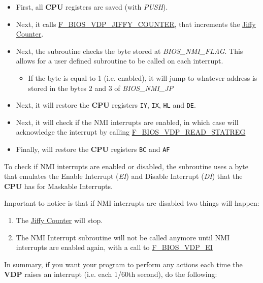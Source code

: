 \documentclass[a4paper,11pt]{article}
\begin{document}
    \begin{itemize}
        \item First, all \textbf{CPU} registers are saved (with \textit{PUSH}).
        \item Next, it calls \hyperref[func:fbiosvdpjiffycounter]
        {F\_BIOS\_VDP\_JIFFY\_COUNTER}, that increments the
        \hyperref[subsec:jiffy_counter]{Jiffy Counter}.
        \item Next, the subroutine checks the byte stored at
        \textit{BIOS\_NMI\_FLAG}. This allows for a user defined subroutine to
        be called on each interrupt.
        \begin{itemize}
            \item If the byte is equal to 1 (i.e. enabled), it will jump to
            whatever address is stored in the bytes 2 and 3 of
            \textit{BIOS\_NMI\_JP}
        \end{itemize}
        \item Next, it will restore the \textbf{CPU} registers \texttt{IY}, 
        \texttt{IX}, \texttt{HL} and \texttt{DE}.
        \item Next, it will check if the NMI interrupts are enabled, in which
        case will acknowledge the interrupt by calling
        \hyperref[func:fbiosvdpreadstatreg]{F\_BIOS\_VDP\_READ\_STATREG}
        \item Finally, will restore the \textbf{CPU} registers \texttt{BC} and 
        \texttt{AF}
    \end{itemize}

    To check if NMI interrupts are enabled or disabled, the subroutine uses a
    byte that emulates the Enable Interrupt (\textit{EI}) and Disable Interrupt
    (\textit{DI}) that the \textbf{CPU} has for Maskable Interrupts.

    Important to notice is that if NMI interrupts are disabled two things will
    happen:
    \begin{enumerate}
        \item The \hyperref[subsec:jiffy_counter]{Jiffy Counter} will stop.
        \item The NMI Interrupt subroutine will not be called anymore until
        NMI interrupts are enabled again, with a call to
        \hyperref[func:fbiosvdpei]{F\_BIOS\_VDP\_EI}
    \end{enumerate}

    In summary, if you want your program to perform any actions each time the
    \textbf{VDP} raises an interrupt (i.e. each 1/60th second), do the following:
\end{document}

